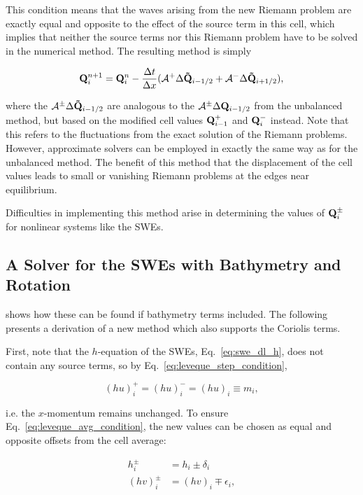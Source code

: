 This condition means that the waves arising from the new Riemann problem are exactly equal and opposite to the effect of the source term in this cell, which implies that neither the source terms nor this Riemann problem have to be solved in the numerical method. The resulting method is simply

\begin{equation}
  \vb Q_i^{n+1} = \vb Q_i^n - \frac{\Delta t}{\Delta x} (\mathcal{A}^+ \Delta \vb{\tilde Q}_{i-1/2} + \mathcal{A}^- \Delta \vb{\tilde Q}_{i+1/2}),
\end{equation}

where the $\mathcal{A}^\pm \Delta \vb{\tilde Q}_{i-1/2}$ are analogous to the $\mathcal{A}^\pm \Delta \vb{Q}_{i-1/2}$ from the unbalanced method, but based on the modified cell values $\vb Q_{i-1}^+$ and $\vb Q_i^-$ instead. Note that this refers to the fluctuations from the exact solution of the Riemann problems. However, approximate solvers can be employed in exactly the same way as for the unbalanced method. The benefit of this method that the displacement of the cell values leads to small or vanishing Riemann problems at the edges near equilibrium.

Difficulties in implementing this method arise in determining the values of $\vb Q_i^\pm$ for nonlinear systems like the SWEs.

\subsection{A Solver for the SWEs with Bathymetry and Rotation}
\label{sec:leveque}

\citet{leveque1998balancing} shows how these can be found if bathymetry terms included. The following presents a derivation of a new method which also supports the Coriolis terms.

First, note that the $h$-equation of the SWEs, Eq.~\ref{eq:swe_dl_h}, does not contain any source terms, so by Eq.~\ref{eq:leveque_step_condition},

\begin{equation}
  (hu)_i^+ = (hu)_i^- = (hu)_i \equiv m_i,
\end{equation}

i.e. the $x$-momentum remains unchanged. To ensure Eq.~\ref{eq:leveque_avg_condition}, the new values can be chosen as equal and opposite offsets from the cell average:

\begin{align}
  h_i^\pm &= h_i \pm \delta_i \\
  (hv)_i^\pm &= (hv)_i \mp \epsilon_i,
\end{align}

